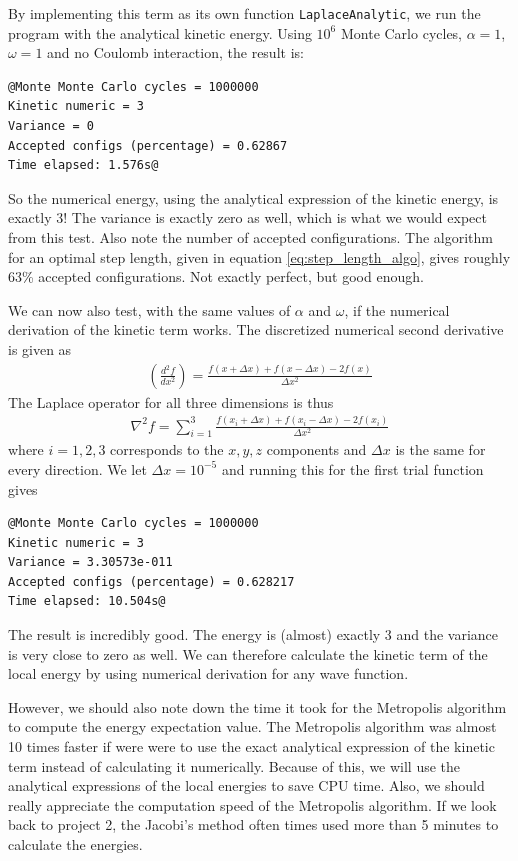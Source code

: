 \documentclass[12pt]{article}
\begin{document}
By implementing this term as its own function \texttt{LaplaceAnalytic}, we run the program with the analytical kinetic energy. Using $10^6$ Monte Carlo cycles, $\alpha = 1$, $\omega = 1$ and no Coulomb interaction, the result is:
\begin{lstlisting}
@Monte Monte Carlo cycles = 1000000
Kinetic numeric = 3
Variance = 0
Accepted configs (percentage) = 0.62867
Time elapsed: 1.576s@
\end{lstlisting}
So the numerical energy, using the analytical expression of the kinetic energy, is exactly 3! The variance is exactly zero as well, which is what we would expect from this test. Also note the number of accepted configurations. The algorithm for an optimal step length, given in equation \ref{eq:step_length_algo}, gives roughly 63\% accepted configurations. Not exactly perfect, but good enough.

We can now also test, with the same values of $\alpha$ and $\omega$, if the numerical derivation of the kinetic term works. The discretized numerical second derivative is given as
\begin{align*}
\left(\frac{d^2f}{dx^2}\right) = \frac{f(x + \Delta x) + f(x - \Delta x) - 2f(x)}{\Delta x^2}
\end{align*}
The Laplace operator for all three dimensions is thus
\begin{align*}
\nabla^2 f = \displaystyle \sum_{i=1}^3 \frac{f(x_i + \Delta x) + f(x_i - \Delta x) - 2f(x_i)}{\Delta x^2} 
\end{align*}
where $i=1,2,3$ corresponds to the $x,y,z$ components and $\Delta x$ is the same for every direction. We let $\Delta x = 10^{-5}$ and running this for the first trial function gives
\begin{lstlisting}
@Monte Monte Carlo cycles = 1000000
Kinetic numeric = 3
Variance = 3.30573e-011
Accepted configs (percentage) = 0.628217
Time elapsed: 10.504s@
\end{lstlisting}
The result is incredibly good. The energy is (almost) exactly 3 and the variance is very close to zero as well. We can therefore calculate the kinetic term of the local energy by using numerical derivation for any wave function.

However, we should also note down the time it took for the Metropolis algorithm to compute the energy expectation value. The Metropolis algorithm was almost 10 times faster if were were to use the exact analytical expression of the kinetic term instead of calculating it numerically. Because of this, we will use the analytical expressions of the local energies to save CPU time. Also, we should really appreciate the computation speed of the Metropolis algorithm. If we look back to project 2, the Jacobi's method often times used more than  5 minutes to calculate the energies.
\end{document}
